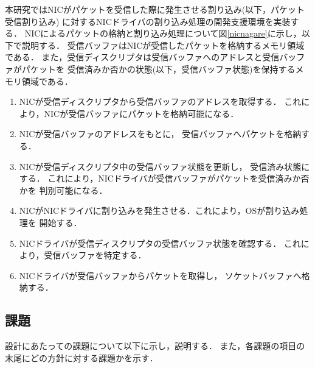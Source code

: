 \documentclass[submit,techreq,noauthor,dvipdfmx]{ipsj}
\begin{document}
本研究ではNICがパケットを受信した際に発生させる割り込み(以下，パケット受信割り込み)
に対するNICドライバの割り込み処理の開発支援環境を実装する．
NICによるパケットの格納と割り込み処理について図\ref{nicnagare}に示し，以下で説明する．
受信バッファはNICが受信したパケットを格納するメモリ領域である．
また，受信ディスクリプタは受信バッファへのアドレスと受信バッファがパケットを
受信済みか否かの状態(以下，受信バッファ状態)を保持するメモリ領域である．
\begin{enumerate}
    \item 
        NICが受信ディスクリプタから受信バッファのアドレスを取得する．
        これにより，NICが受信バッファにパケットを格納可能になる．
    \item 
        NICが受信バッファのアドレスをもとに，
        受信バッファへパケットを格納する．
    \item 
        NICが受信ディスクリプタ中の受信バッファ状態を更新し，
        受信済み状態にする．
        これにより，NICドライバが受信バッファがパケットを受信済みか否かを
        判別可能になる．
    \item 
        NICがNICドライバに割り込みを発生させる．これにより，OSが割り込み処理を
        開始する．
    \item 
        NICドライバが受信ディスクリプタの受信バッファ状態を確認する．
        これにより，受信バッファを特定する．
    \item 
        NICドライバが受信バッファからパケットを取得し，
        ソケットバッファへ格納する．
\end{enumerate}

\subsection{課題}\label{sec:challenge}

設計にあたっての課題について以下に示し，説明する．
また，各課題の項目の末尾にどの方針に対する課題かを示す．
\end{document}
